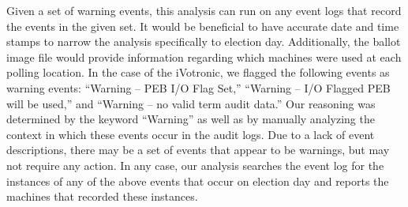 Given a set of warning events, this analysis can run on any event logs that record the events in the given set. It would be beneficial to have accurate date and time stamps to narrow the analysis specifically to election day. Additionally, the ballot image file would provide information regarding which machines were used at each polling location.  In the case of the iVotronic, we flagged the following events as warning events: \textquotedblleft Warning – PEB I/O Flag Set,\textquotedblright \hspace{1 mm} \textquotedblleft Warning – I/O Flagged PEB will be used,\textquotedblright \hspace{1 mm} and \textquotedblleft Warning – no valid term audit data.\textquotedblright \hspace{2 mm} Our reasoning was determined by the keyword \textquotedblleft Warning\textquotedblright \hspace{1 mm} as well as by manually analyzing the context in which these events occur in the audit logs. Due to a lack of event descriptions, there may be a set of events that appear to be warnings, but may not require any action. In any case, our analysis searches the event log for the instances of any of the above events that occur on election day and reports the machines that recorded these instances. 
